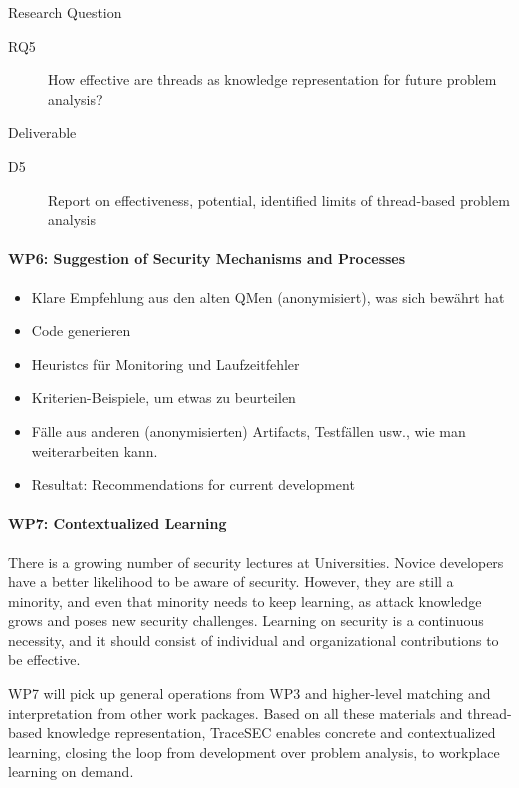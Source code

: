 Research Question
\begin{description}
	\item[RQ5]	How effective are threads as knowledge representation for future problem analysis?
\end{description}
	
Deliverable
\begin{description}
	\item[D5] Report on effectiveness, potential, identified limits of thread-based problem analysis
\end{description}

\paragraph*{WP6: Suggestion of Security Mechanisms and Processes}
\begin{itemize}
\item Klare Empfehlung aus den alten QMen (anonymisiert), was sich bewährt hat
\item Code generieren
\item Heuristcs für Monitoring und Laufzeitfehler
\item Kriterien-Beispiele, um etwas zu beurteilen
\item Fälle aus anderen (anonymisierten) Artifacts, Testfällen usw., wie man weiterarbeiten kann.
\item Resultat:  Recommendations for current development
\end{itemize}

\paragraph*{WP7: Contextualized Learning}
There is a growing number of security lectures at Universities. Novice developers have a better likelihood to be aware of security. However, they are still a minority, and even that minority needs to keep learning, as attack knowledge grows and poses new security challenges. Learning on security is a continuous necessity, and it should consist of individual and organizational contributions to be effective.

WP7 will pick up general operations from WP3 and higher-level matching and interpretation from other work packages. Based on all these materials and thread-based knowledge representation, TraceSEC enables concrete and contextualized learning, closing the loop from development over problem analysis, to workplace learning on demand.

